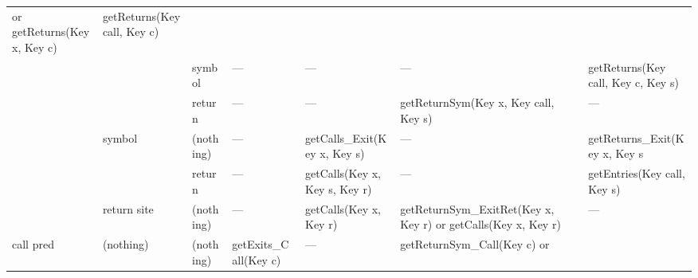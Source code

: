 \begin{sidewaystable}
\begin{tabular}{x{0.6in}x{0.6in}x{0.6in}|x{1.9in}x{1.9in}x{1.9in}x{2in}}
                                                                                                                                        or getReturns(Key x, Key c)         &  getReturns(Key call, Key c)           \tabularnewline
                &                   &  symbol       &      ---                             &    ---                                  &        ---                                 &  getReturns(Key call, Key c, Key s)  \tabularnewline
                &                   &  return       &      ---                             &    ---                                  &  getReturnSym(Key x, Key call, \newline
                                                                                                                                        \phantom{GetReturnSym(}Key s)           &    ---                                    \tabularnewline
                &  symbol           &  (nothing)    &      ---                             &  getCalls\_Exit(Key x, Key s)      &        ---                                 &  getReturns\_Exit(Key x, Key s       \tabularnewline
                &                   &  return       &      ---                             &  getCalls(Key x, Key s, Key r)   &        ---                                 &  getEntries(Key call, Key s)            \tabularnewline
                &  return site      &  (nothing)    &      ---                             &  getCalls(Key x, Key r)            &  getReturnSym\_ExitRet(Key x, Key r) \newline
                                                                                                                                        or getCalls(Key x, Key r)            &   ---                                     \tabularnewline
\midrule %
 call pred      &  (nothing)        &  (nothing)    & getExits\_Call(Key c)             &   ---                                   &  getReturnSym\_Call(Key c) or \newline

\end{tabular}
\end{sidewaystable}
